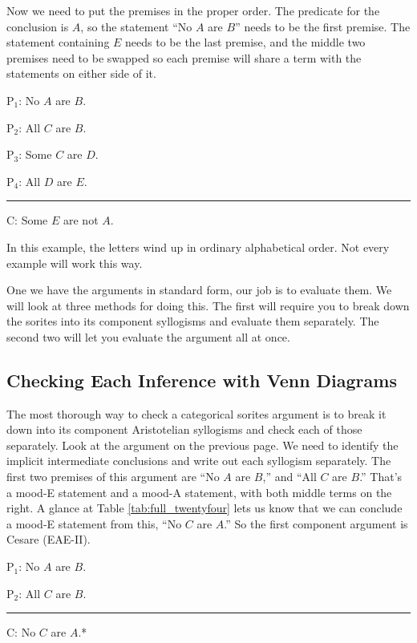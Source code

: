 Now we need to put the premises in the proper order. The predicate for the conclusion is $A$, so the statement ``No $A$ are $B$'' needs to be the first premise. The statement containing $E$ needs to be the last premise, and the middle two premises need to be swapped so each premise will share a term with the statements on either side of it.

\begin{earg}
\item[P$_1$:] No $A$ are $B$.
\item[P$_2$:] All $C$ are $B$. %
\item[P$_3$:] Some $C$ are $D$.  %
\item[P$_4$:] All $D$ are $E$.
\vspace{-.5em}
\item [] \rule{0.2\linewidth}{.5pt} 
\item[C:] Some $E$ are not $A$.  %
\end{earg} 
\label{standard_forms_sorites_1}

In this example, the letters wind up in ordinary alphabetical order. Not every example will work this way.

One we have the arguments in standard form, our job is to evaluate them. We will look at three methods for doing this. The first will require you to break down the sorites into its component syllogisms and evaluate them separately. The second two will let you evaluate the argument all at once. 

\subsection{Checking Each Inference with Venn Diagrams}

The most thorough way to check a categorical sorites argument is to break it down into its component Aristotelian syllogisms and check each of those separately. Look at the argument on the previous page. We need to identify the implicit intermediate conclusions and write out each syllogism separately. The first two premises of this argument are ``No $A$ are $B$,'' and ``All $C$ are $B$.'' That's a mood-E statement and a mood-A statement, with both middle terms on the right. A glance at Table \ref{tab:full_twentyfour} lets us know that we can conclude a mood-E statement from this, ``No $C$ are $A$.'' So the first component argument is Cesare (EAE-II).

\begin{earg}
\item[P$_1$:] No $A$ are $B$.
\item[P$_2$:] All $C$ are $B$. %
\vspace{-.5em}
\item [] \rule{0.2\linewidth}{.5pt} 
\item[C:] No $C$ are $A$.*
\end{earg}

